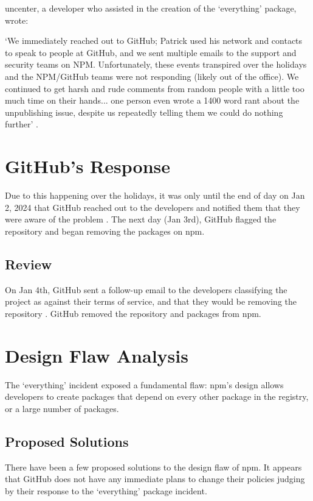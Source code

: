 \documentclass[acmsmall]{acmart}
\begin{document}
uncenter, a developer who assisted in the creation of the `everything' package,
wrote:

`We immediately reached out to GitHub; Patrick used his network and contacts to
speak to people at GitHub, and we sent multiple emails to the support and
security teams on NPM. Unfortunately, these events transpired over the holidays
and the NPM/GitHub teams were not responding (likely out of the office). We
continued to get harsh and rude comments from random people with a little too
much time on their hands... one person even wrote a 1400 word rant about the
unpublishing issue, despite us repeatedly telling them we could do nothing
further' \cite{uncenter-blog-everything}.

\section{GitHub's Response}
Due to this happening over the holidays, it was only until the end of day on Jan
2, 2024 that GitHub reached out to the developers and notified them that they
were aware of the problem \cite{uncenter-blog-everything}. The next day (Jan 3rd),
GitHub flagged the repository and began removing the packages on npm.

\subsection{Review}
On Jan 4th, GitHub sent a follow-up email to the developers classifying the
project as against their terms of service, and that they would be removing the
repository \cite{uncenter-blog-everything}. GitHub removed the repository and
packages from npm.

\section{Design Flaw Analysis}
The `everything' incident exposed a fundamental flaw: npm's design allows
developers to create packages that depend on every other package in the registry,
or a large number of packages.

\subsection{Proposed Solutions}
There have been a few proposed solutions to the design flaw of npm.
It appears that GitHub does not have any immediate plans to change their
policies judging by their response to the `everything' package incident.
\end{document}
